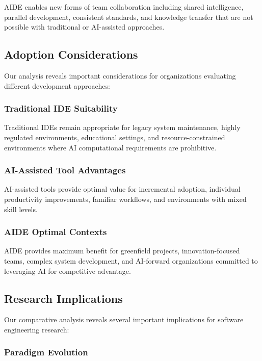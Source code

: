 AIDE enables new forms of team collaboration including shared intelligence, parallel development, consistent standards, and knowledge transfer that are not possible with traditional or AI-assisted approaches.

\subsection{Adoption Considerations}

Our analysis reveals important considerations for organizations evaluating different development approaches:

\subsubsection{Traditional IDE Suitability}

Traditional IDEs remain appropriate for legacy system maintenance, highly regulated environments, educational settings, and resource-constrained environments where AI computational requirements are prohibitive.

\subsubsection{AI-Assisted Tool Advantages}

AI-assisted tools provide optimal value for incremental adoption, individual productivity improvements, familiar workflows, and environments with mixed skill levels.

\subsubsection{AIDE Optimal Contexts}

AIDE provides maximum benefit for greenfield projects, innovation-focused teams, complex system development, and AI-forward organizations committed to leveraging AI for competitive advantage.

\subsection{Research Implications}

Our comparative analysis reveals several important implications for software engineering research:

\subsubsection{Paradigm Evolution}

